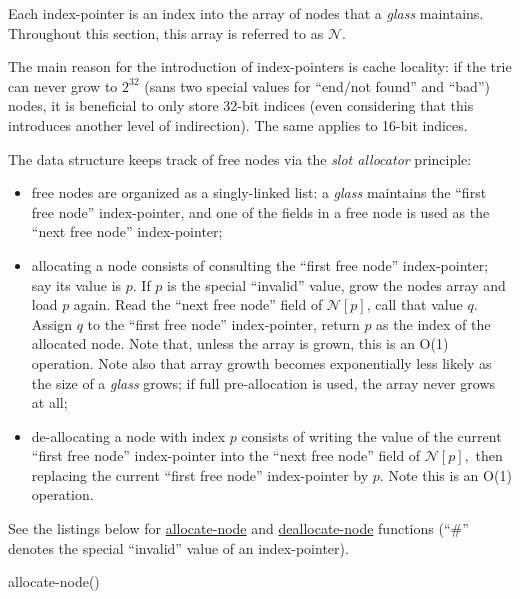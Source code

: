 \documentclass[a4paper,12pt]{article}
\begin{document}
Each index-pointer is an index into the array of nodes that a \textit{glass} maintains. Throughout this section, this array is referred to as $\mathcal{N}.$

The main reason for the introduction of index-pointers is cache locality:
if the trie can never grow to $2^{32}$ (sans two special values for ``end/not found'' and ``bad'') nodes,
it is beneficial to only store 32-bit indices (even considering that this introduces another level of indirection).
The same applies to 16-bit indices.

The data structure keeps track of free nodes via the \textit{slot allocator} principle:
\begin{itemize}
    \item free nodes are organized as a singly-linked list: a \textit{glass} maintains the ``first free node'' index-pointer,
    and one of the fields in a free node is used as the ``next free node'' index-pointer;

    \item allocating a node consists of consulting the ``first free node'' index-pointer; say its value is $p.$ If $p$ is the special ``invalid'' value, grow the nodes array and load $p$ again.
      Read the ``next free node'' field of $\mathcal{N}[p]$, call that value $q.$ Assign $q$ to the ``first free node'' index-pointer, return $p$ as the index of the allocated node.
      Note that, unless the array is grown, this is an O(1) operation.
      Note also that array growth becomes exponentially less likely as the size of a \textit{glass} grows; if full pre-allocation is used, the array never grows at all;

    \item de-allocating a node with index $p$ consists of writing the value of the current ``first free node'' index-pointer into the ``next free node'' field of $\mathcal{N}[p],$
    then replacing the current ``first free node'' index-pointer by $p.$ Note this is an O(1) operation.
\end{itemize}

See the listings below for \underline{allocate-node} and \underline{deallocate-node} functions (``$\#$'' denotes the special ``invalid'' value of an index-pointer).

\begin{procedure}[H]
\DontPrintSemicolon
\caption{allocate-node()}
\end{procedure}
\end{document}

